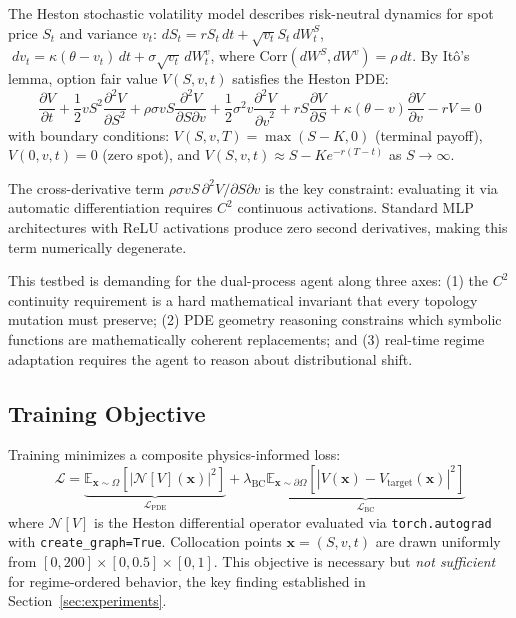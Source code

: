 \documentclass[11pt,a4paper]{article}
\begin{document}
The Heston stochastic volatility model \citep{heston1993closed} describes risk-neutral
dynamics for spot price $S_t$ and variance $v_t$:
$dS_t = r S_t \, dt + \sqrt{v_t} S_t \, dW_t^S$, $\;dv_t = \kappa(\theta - v_t) \, dt + \sigma \sqrt{v_t} \, dW_t^v$,
where $\text{Corr}(dW^S, dW^v) = \rho \, dt$. By It\^o's lemma, option fair value
$V(S,v,t)$ satisfies the Heston PDE:
\begin{equation}
\frac{\partial V}{\partial t}
+ \frac{1}{2}vS^2\frac{\partial^2 V}{\partial S^2}
+ \rho\sigma vS\frac{\partial^2 V}{\partial S\partial v}
+ \frac{1}{2}\sigma^2 v\frac{\partial^2 V}{{\partial v}^2}
+ rS\frac{\partial V}{\partial S}
+ \kappa(\theta-v)\frac{\partial V}{\partial v}
- rV = 0
\label{eq:heston_pde}
\end{equation}
with boundary conditions:
$V(S, v, T) = \max(S - K, 0)$ (terminal payoff),
$V(0, v, t) = 0$ (zero spot), and
$V(S, v, t) \approx S - Ke^{-r(T-t)}$ as $S \to \infty$.

The cross-derivative term $\rho\sigma vS \,\partial^2 V / \partial S \partial v$ is
the key constraint: evaluating it via automatic differentiation requires $C^2$
continuous activations. Standard MLP architectures with ReLU activations produce
zero second derivatives, making this term numerically degenerate.

This testbed is demanding for the dual-process agent along three axes: (1) the $C^2$
continuity requirement is a hard mathematical invariant that every topology mutation
must preserve; (2) PDE geometry reasoning constrains which symbolic functions are
mathematically coherent replacements; and (3) real-time regime adaptation requires
the agent to reason about distributional shift.

\subsection{Training Objective}
\label{sec:background:loss}

Training minimizes a composite physics-informed loss:
\begin{equation}
\mathcal{L} = \underbrace{\mathbb{E}_{\bm{x} \sim \Omega}\!\left[\left|\mathcal{N}[V](\bm{x})\right|^2\right]}_{\mathcal{L}_\text{PDE}}
+ \lambda_\text{BC}\underbrace{\mathbb{E}_{\bm{x} \sim \partial\Omega}\!\left[\left|V(\bm{x}) - V_\text{target}(\bm{x})\right|^2\right]}_{\mathcal{L}_\text{BC}}
\label{eq:loss}
\end{equation}
where $\mathcal{N}[V]$ is the Heston differential operator evaluated via
\texttt{torch.autograd} with \texttt{create\_graph=True}. Collocation points
$\bm{x}=(S,v,t)$ are drawn uniformly from $[0,200]\times[0,0.5]\times[0,1]$.
This objective is necessary but \emph{not sufficient} for regime-ordered behavior,
the key finding established in Section~\ref{sec:experiments}.
\end{document}
